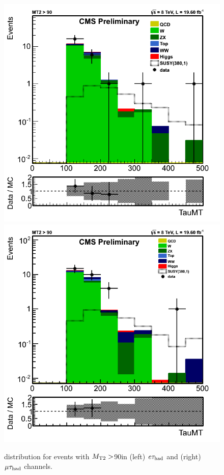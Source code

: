\begin{figure}[!Hhtb]
\centering
\includegraphics[angle=0,scale=0.35]{SelectionEleTau/TauMT.png}
\includegraphics[angle=0,scale=0.35]{SelectionMuTau/tauMT_Ratio_MT2gt90_unBlinded.png}
\caption{\tauMT distribution for events with ${M_{\rm T2}}>$90\GeV in (left) $e\tau_{\rm had}$ and (right) $\mu\tau_{\rm had}$ channels.}
\label{fig:taumtleptontau}
\end{figure}

